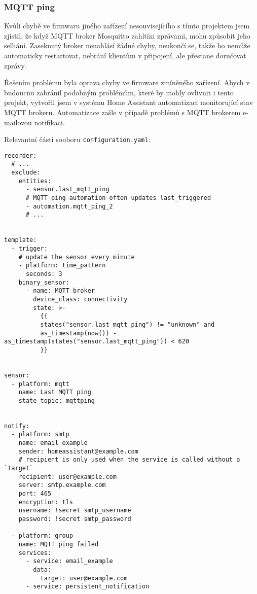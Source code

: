 \subsubsection{MQTT ping}  %
Kvůli chybě ve firmwaru jiného zařízení nesouvisejícího s tímto projektem jsem
zjistil, že když MQTT broker Mosquitto zahltím zprávami, mohu způsobit jeho
selhání. Zaseknutý broker nenahlásí žádné chyby, neukončí se, takže ho
 nemůže automaticky restartovat, nebrání klientům
v připojení, ale přestane doručovat zprávy.

Řešením problému byla oprava chyby ve firmware zmíněného zařízení. Abych
v budoucnu zabránil podobným problémům, které by mohly ovlivnit i tento
projekt, vytvořil jsem v systému Home Assistant automatizaci monitorující stav
MQTT brokeru. Automatizace zašle v případě problémů s MQTT brokerem e-mailovou
notifikaci.

Relevantní části souboru \texttt{configuration.yaml}:
\begin{lstlisting}
recorder:
  # ...
  exclude:
    entities:
      - sensor.last_mqtt_ping
      # MQTT ping automation often updates last_triggered
      - automation.mqtt_ping_2
      # ...


template:
  - trigger:
    # update the sensor every minute
    - platform: time_pattern
      seconds: 3
    binary_sensor:
      - name: MQTT broker
        device_class: connectivity
        state: >-
          {{
          states("sensor.last_mqtt_ping") != "unknown" and
          as_timestamp(now()) - as_timestamp(states("sensor.last_mqtt_ping")) < 620
          }}


sensor:
  - platform: mqtt
    name: Last MQTT ping
    state_topic: mqttping


notify:
  - platform: smtp
    name: email example
    sender: homeassistant@example.com
    # recipient is only used when the service is called without a `target`
    recipient: user@example.com
    server: smtp.example.com
    port: 465
    encryption: tls
    username: !secret smtp_username
    password: !secret smtp_password

  - platform: group
    name: MQTT ping failed
    services:
      - service: email_example
        data:
          target: user@example.com
      - service: persistent_notification
\end{lstlisting}


